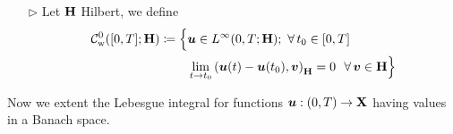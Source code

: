 \begin{itemize}
    \item[$\triangleright$] Let $\mathbf{H}$ Hilbert, we define
    \begin{align*}
     \mathcal{C}^0_{\mathrm w}([0,T];\mathbf{H})\coloneq \Big\{ & \bm u\in L^\infty (0,T;\mathbf{H});\ \forall\, t_0\in[0,T]  \\
    & \displaystyle \lim_{t\to t_0} \left( \bm u(t)-\bm u(t_0),\bm v \right)_{\mathbf{H}}=0\ \ \forall\, \bm v \in \mathbf{H} \Big\}
    \end{align*}    
\end{itemize}

\vspace{-0.7em}

\noindent\rlap{\rule[1.5ex]{0.495\textwidth}{.2pt}}

Now we extent the Lebesgue integral for functions $\bm u:(0,T)\to\mathbf{X}$ having values in a Banach space. 
